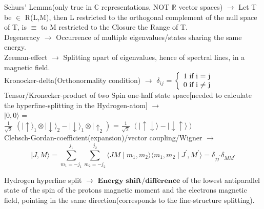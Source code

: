 \documentclass[a4paper, 10pt, onepage]{elegantbook}
\begin{document}
{Schurs' Lemma(only true in $\mathbb C$ representations, NOT $\mathbb R$ vector spaces) $\longrightarrow$ Let T be $\in$ R(L,M), then L restricted to the orthogonal complement of the null space
of T, is $\equiv$ to M restricted to the Closure the Range of T.  \\
  
Degeneracy $\longrightarrow$ Occurrence of multiple eigenvalues/states sharing the same energy. \\ 

Zeeman-effect $\longrightarrow$ Splitting apart of eigenvalues, hence of spectral lines, in a magnetic field. \\
  
Kronocker-delta(Orthonormality condition) $\longrightarrow$
$\delta_{ij}$ = $\left\{
\begin{array}{ll}
1 \text{ if i = j}  \\
0 \text{ if i $\neq$ j} \\
\end{array} \\
\right.$ \\
 
Tensor/Kronecker-product of two Spin one-half state space[needed to calculate the hyperfine-splitting in the Hydrogen-atom] $\longrightarrow$  \\

$ \mid 0, 0 \rangle$ =  \\
$\frac{1}{\sqrt 2}$ $\left( \mid \uparrow \rangle_1 \otimes \mid \downarrow \rangle_2 - \mid \downarrow \rangle_1 \otimes \mid \uparrow_2 \right)$ = $\frac{1}{\sqrt 2}$ $\left( \mid \uparrow \downarrow \rangle - \mid \downarrow \uparrow \rangle \right)$  \\
  
Clebsch-Gordan-coefficient(expansion)/vector coupling/Wigner $\longrightarrow$ \\
\begin{equation}
\mid J,M \rangle = \sum_{m_1 = {-j_1}}^{j_1} \sum_{m_2 = {-j_2}}^{j_2} \langle{JM} \mid {m_1,m_2} \rangle \langle{m_1,m_2} \mid J^{'},M^{'} \rangle = \delta_{jj^{'}} \delta_{MM^{'}}
\end{equation}
    
Hydrogen hyperfine split $\longrightarrow$ $\mathbf{\text{Energy shift/difference}}$ of the lowest antiparallel state of the spin of the protons magnetic moment and the electrons magnetic field, pointing in the same direction(corresponds to the fine-structure splitting).  \\  
    
}
\end{document}
